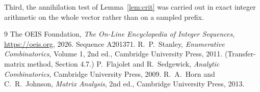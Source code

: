 \documentclass[11pt,a4paper]{article}
\theoremstyle{plain}
\theoremstyle{definition}
\begin{document}
Third, the annihilation test of Lemma~\ref{lem:crit} was carried out in exact integer
arithmetic on the whole vector rather than on a sampled prefix.

\begin{thebibliography}{9}
 The OEIS Foundation, \emph{The On-Line Encyclopedia of Integer
Sequences}, \url{https://oeis.org}, 2026. Sequence A201371.
 R.~P.~Stanley, \emph{Enumerative Combinatorics}, Volume 1, 2nd ed.,
Cambridge University Press, 2011. (Transfer-matrix method, Section 4.7.)
 P.~Flajolet and R.~Sedgewick, \emph{Analytic Combinatorics}, Cambridge
University Press, 2009.
 R.~A.~Horn and C.~R.~Johnson, \emph{Matrix Analysis}, 2nd ed., Cambridge
University Press, 2013.
\end{thebibliography}
\end{document}
